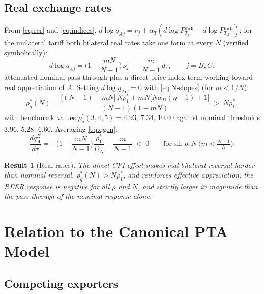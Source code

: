 \documentclass[11pt]{article}
\newtheorem{result}{Result}[section]
\begin{document}
\subsection{Real exchange rates}

From \eqref{eq:rer} and \eqref{eq:indices}, $d\log q_{Aj} = \nu_j + \alpha_T(d\log P_{T_j}^{\mathrm{own}} - d\log P_{T_A}^{\mathrm{own}})$; for the unilateral tariff both bilateral real rates take one form at every $N$ (verified symbolically):
\begin{equation}
d\log q_{Aj} = \Big( 1 - \frac{mN}{N-1} \Big)\, \nu_j \;-\; \frac{m}{N-1}\, d\tau,
\qquad j = B, C :
\label{eq:qgen}
\end{equation}
attenuated nominal pass-through plus a direct price-index term working toward real appreciation of $A$. Setting $d\log q_{AC} = 0$ with \eqref{eq:N-slopes} (for $m < 1/N$):
\begin{equation}
\rho_q^*(N) = \frac{\big[(N-1) - mN\big]\, N\rho_1^* + mN\big[ N\alpha_D(\eta-1) + 1 \big]}{(N-1)(1 - mN)}
\;>\; N\rho_1^* ,
\label{eq:N-rhoq}
\end{equation}
with benchmark values $\rho_q^*(3, 4, 5) = 4.93,\, 7.34,\, 10.40$ against nominal thresholds $3.96,\, 5.28,\, 6.60$. Averaging \eqref{eq:qgen}:
\begin{equation}
\frac{dq_A^E}{d\tau}
= -\Big( 1 - \frac{mN}{N-1} \Big) \frac{\rho_1^*}{D_N} - \frac{m}{N-1}
\;<\; 0
\qquad \text{for all } \rho, N \ \big(m < \tfrac{N-1}{N}\big) .
\label{eq:N-reer}
\end{equation}

\begin{result}[Real rates]
The direct CPI effect makes real bilateral reversal harder than nominal reversal, $\rho_q^*(N) > N\rho_1^*$, and reinforces effective appreciation: the REER response is negative for all $\rho$ and $N$, and strictly larger in magnitude than the pass-through of the nominal response alone.
\label{res:real}
\end{result}

\section{Relation to the Canonical PTA Model}

\subsection{Competing exporters}
\end{document}
